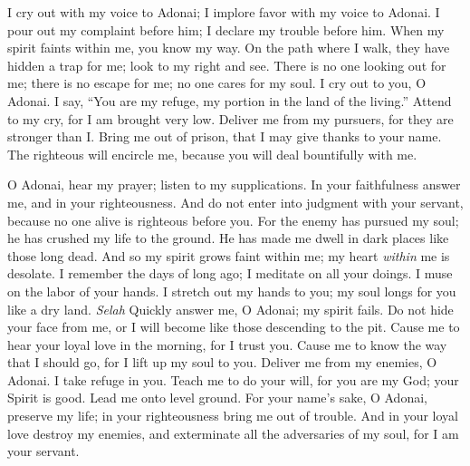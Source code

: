 \begin{biblechapter} %
 I cry out with my voice to Adonai; 
I implore favor with my voice to Adonai.
\verse I pour out my complaint before him; 
I declare my trouble before him.
\verse When my spirit faints within me, 
you know my way. 
On the path where I walk, 
they have hidden a trap for me;
\verse look to my right and see. 
There is no one looking out for me; 
there is no escape for me; 
no one cares for my soul.
\verse I cry out to you, O Adonai. 
I say, “You are my refuge, 
my portion in the land of the living.”
\verse Attend to my cry, 
for I am brought very low. 
Deliver me from my pursuers, 
for they are stronger than I.
\verse Bring me out of prison, 
that I may give thanks to your name. 
The righteous will encircle me, 
because you will deal bountifully with me.
\end{biblechapter}

\begin{biblechapter} %
 O Adonai, hear my prayer; 
listen to my supplications. 
In your faithfulness answer me, 
and in your righteousness.
\verse And do not enter into judgment with your servant, 
because no one alive is righteous before you.
\verse For the enemy has pursued my soul; 
he has crushed my life to the ground. 
He has made me dwell in dark places 
like those long dead.
\verse And so my spirit grows faint within me; 
my heart \textit{within} me is desolate.
\verse I remember the days of long ago; 
I meditate on all your doings. 
I muse on the labor of your hands.
\verse I stretch out my hands to you; 
my soul longs for you like a dry land. \textit{Selah}
\verse Quickly answer me, O Adonai; 
my spirit fails. 
Do not hide your face from me, 
or I will become 
like those descending to the pit.
\verse Cause me to hear your loyal love in the morning, 
for I trust you. 
Cause me to know the way that I should go, 
for I lift up my soul to you.
\verse Deliver me from my enemies, O Adonai. 
I take refuge in you.
\verse Teach me to do your will, for you are my God; 
your Spirit is good. 
Lead me onto level ground.
\verse For your name’s sake, O Adonai, preserve my life; 
in your righteousness bring me out of trouble.
\verse And in your loyal love destroy my enemies, 
and exterminate all the adversaries of my soul, 
for I am your servant.
\end{biblechapter}


